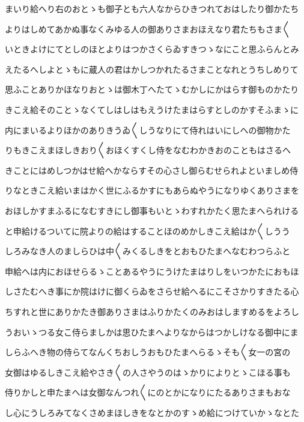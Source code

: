 \documentclass[a4paper,11pt,landscape]{ltjtarticle}
\begin{document}
\par\medskip
まいり給へり右のおとゝも御子とも六人なからひきつれておはしたり御かたち
\par\medskip
よりはしめてあかぬ事なくみゆる人の御ありさまおほえなり君たちもさま〱
\par\medskip
いときよけにてとしのほとよりはつかさくらゐすきつゝなにこと思ふらんとみ
\par\medskip
えたるへしよとゝもに蔵人の君はかしつかれたるさまことなれとうちしめりて
\par\medskip
思ふことありかほなりおとゝは御木丁へたてゝむかしにかはらす御ものかたり
\par\medskip
きこえ給そのことゝなくてしはしはもえうけたまはらすとしのかすそふまゝに
\par\medskip
内にまいるよりほかのありきうゐ〱しうなりにて侍れはいにしへの御物かた
\par\medskip
りもきこえまほしきおり〱おほくすくし侍をなむわかきおのこともはさるへ
\par\medskip
きことにはめしつかはせ給へかならすその心さし御らむせられよといましめ侍
\par\medskip
りなときこえ給いまはかく世にふるかすにもあらぬやうになりゆくありさまを
\par\medskip
おほしかすまふるになむすきにし御事もいとゝわすれかたく思たまへられける
\par\medskip
と申給けるついてに院よりの給はすることほのめかしきこえ給はか〱しうう
\par\medskip
しろみなき人のましらひは中〱みくるしきをとおもひたまへなむわつらふと
\par\medskip
申給へは内におほせらるゝことあるやうにうけたまはりしをいつかたにおもほ
\par\medskip
しさたむへき事にか院はけに御くらゐをさらせ給へるにこそさかりすきたる心
\par\medskip
ちすれと世にありかたき御ありさまはふりかたくのみおはしますめるをよろし
\par\medskip
うおいゝつる女こ侍らましかは思ひたまへよりなからはつかしけなる御中にま
\par\medskip
しらふへき物の侍らてなんくちおしうおもひたまへらるゝそも〱女一の宮の
\par\medskip
女御はゆるしきこえ給やさき〱の人さやうのはゝかりによりとゝこほる事も
\par\medskip
侍りかしと申たまへは女御なんつれ〱にのとかになりにたるありさまもおな
\par\medskip
し心にうしろみてなくさめまほしきをなとかのすゝめ給につけていかゝなとた
\par\medskip
\end{document}
